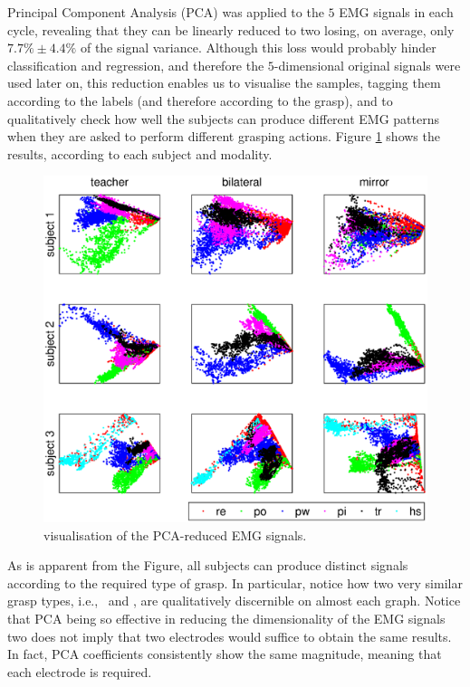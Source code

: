 Principal Component Analysis (PCA) was applied to the $5$ EMG signals in
each cycle, revealing that they can be linearly reduced to two losing,
on average, only $7.7\% \pm 4.4\%$ of the signal variance. Although this
loss would probably hinder classification and regression, and therefore
the $5$-dimensional original signals were used later on, this reduction
enables us to visualise the samples, tagging them according to the labels
(and therefore according to the grasp), and to qualitatively check
how well the subjects can produce different EMG
patterns when they are asked to perform different grasping
actions. Figure \ref{fig:PCA} shows the results, according to each
subject and modality.

\begin{figure}[!ht] \centering
  \includegraphics[width=\textwidth]{figs/figPCA}
  \caption{visualisation of the PCA-reduced EMG signals.}
  \label{fig:PCA}
\end{figure}

As is apparent from the Figure, all subjects can produce distinct signals
according to the required type of grasp. In particular,
notice how two very similar grasp types, i.e.,
\pi\ and \tr, are qualitatively discernible on almost each graph.
Notice that PCA being so effective in reducing the
dimensionality of the EMG signals two does not imply that
two electrodes would suffice to obtain the same results. In fact, PCA coefficients
consistently show the same magnitude, meaning that each electrode
is required.

